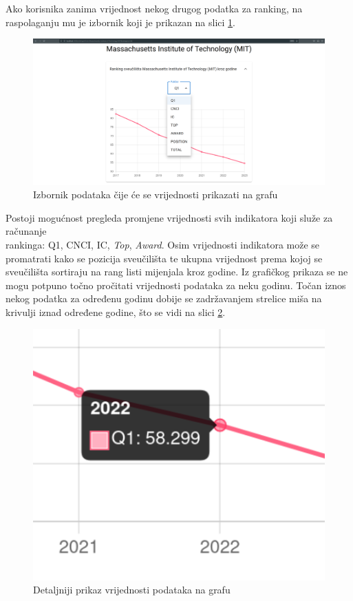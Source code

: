 \documentclass[times, utf8, zavrsni]{fer}
\begin{document}
Ako korisnika zanima vrijednost nekog drugog podatka za ranking, na raspolaganju mu je izbornik 
koji je prikazan na slici \ref{fig:unipage2}. 
\begin{figure}[htb]
    \hspace*{-2cm}  
       \includegraphics[scale=0.21]{uni2.png} 
       \caption{Izbornik podataka čije će se vrijednosti prikazati na grafu}
       \label{fig:unipage2}
       \end{figure}
Postoji mogućnost pregleda promjene vrijednosti svih indikatora koji služe za računanje \\rankinga: Q1, CNCI, IC, \emph{Top}, \emph{Award}. 
Osim vrijednosti indikatora može se promatrati kako se pozicija  sveučilišta te ukupna vrijednost  prema kojoj se sveučilišta 
sortiraju na rang listi mijenjala kroz godine. Iz grafičkog prikaza se ne mogu potpuno točno pročitati vrijednosti podataka za neku godinu. Točan iznos 
nekog podatka za određenu godinu dobije se zadržavanjem strelice miša na krivulji iznad određene godine, što se vidi na slici \ref{fig:detail}.
\begin{figure}[htb]
            \centering
               \includegraphics[scale=0.4]{detail.png} 
               \caption{Detaljniji prikaz vrijednosti podataka na grafu}
               \label{fig:detail}
               \end{figure}           
\end{document}
